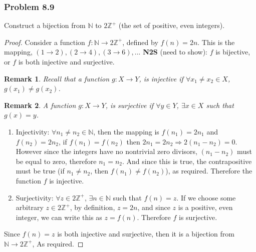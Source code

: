 \documentclass[hidelinks,12pt]{article}
\newtheorem*{remark}{Remark}
\newcommand{\N}{\mathbb{N}}
\newcommand{\Z}{\mathbb{Z}}
\begin{document}
\subsubsection{Problem 8.9}
Construct a bijection from $\N$ to $2\Z^+$ (the set of positive, even integers).
\begin{proof}
Consider a function $f:\N\to2\Z^+$, defined by $f(n)=2n$. This is the mapping, $(1\to2), (2\to4),(3\to6),...$
\newline \textbf{N2S} (need to show): $f$ is bijective, or $f$ is both injective and surjective.
\begin{remark}
Recall that a function $g:X\to Y$, is injective if $\forall x_1\neq x_2\in X$, $g(x_1)\neq g(x_2)$.\end{remark}
\begin{remark}
A function $g:X\to Y$, is surjective if $\forall y\in Y$, $\exists x\in X$ such that $g(x)=y$.\end{remark}
\begin{enumerate}
    \item Injectivity: $\forall n_1\neq n_2\in\N$, then the mapping is $f(n_1)=2n_1$ and $f(n_2)=2n_2$, if $f(n_1)=f(n_2)$ then $2n_1=2n_2\Longrightarrow2(n_1-n_2)=0$. However since the integers have no nontrivial zero divisors, $(n_1-n_2)$ must be equal to zero, therefore $n_1=n_2$. And since this is true, the contrapositive must be true (if $n_1\neq n_2$, then $f(n_1)\neq f(n_2)$), as required. Therefore the function $f$ is injective.
    \item Surjectivity: $\forall z\in 2\Z^+$, $\exists n\in\N$ such that $f(n)=z$. If we choose some arbitrary $z\in2\Z^+$, by definition, $z=2n$, and since $z$ is a positive, even integer, we can write this as $z=f(n)$. Therefore $f$ is surjective.
\end{enumerate}
Since $f(n)=z$ is both injective and surjective, then it is a bijection from $\N\to2\Z^+$, As required.
\end{proof}
\end{document}
